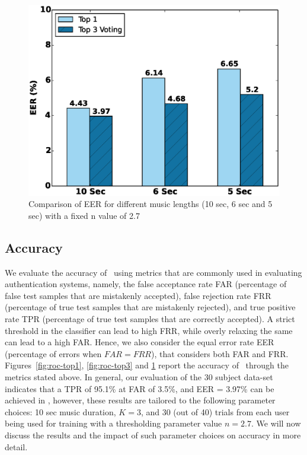 \begin{figure}[t]
\centering
\includegraphics [width=\columnwidth]{figure/exp2_vary_length.eps}
\caption{Comparison of EER for different music lengths (10 sec, 6 sec and 5 
sec) with a fixed n value of 2.7}
\label{fig:eer-length}
\end{figure}


\subsection{Accuracy}
We evaluate the accuracy of \systemname~using metrics that are commonly used 
in evaluating authentication systems, namely,
the false acceptance rate FAR (percentage of false test samples that are 
mistakenly accepted), false rejection rate FRR (percentage of true test 
samples that are mistakenly rejected), and true positive rate 
TPR (percentage of true test samples that are correctly accepted). 
A strict threshold in the classifier can lead to high FRR, while 
overly relaxing the same can lead to a high FAR. Hence, we also consider 
the equal error rate EER (percentage of errors when $FAR = FRR$), that 
considers both FAR and FRR.
Figures~\ref{fig:roc-top1}, \ref{fig:roc-top3} and \ref{fig:eer-length} report 
the accuracy 
of \systemname~through the metrics stated above. 
In general, our evaluation of the 30 subject data-set indicates that a 
TPR of 95.1\% at FAR of 3.5\%, and EER = 3.97\% can be achieved in 
\systemname, however, these results are tailored to the following parameter 
choices:
10 sec music duration, $K = 3$, and 30 (out of 40) trials from each user being 
used for training with a thresholding parameter value $n = 2.7$. 
We will now discuss the results and the impact of such parameter choices 
on accuracy in more detail.

